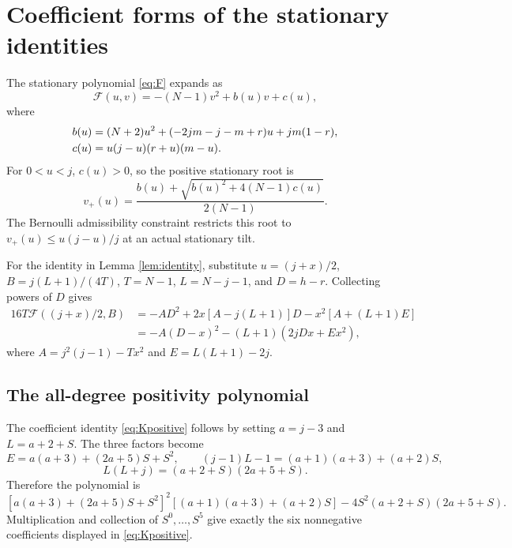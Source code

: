\section{Coefficient forms of the stationary identities}\label{app:algebra}
The stationary polynomial \eqref{eq:F} expands as
\begin{equation}\label{eq:explicitF}
 \mathcal F(u,v)=-(N-1)v^2+b(u)v+c(u),
\end{equation}
where
\begin{align}\label{eq:bc}
 b(u)&=(N+2)u^2+(-2jm-j-m+r)u+jm(1-r),\\
 c(u)&=u(j-u)(r+u)(m-u).\notag
\end{align}
For $0<u<j$, $c(u)>0$, so the positive stationary root is
\begin{equation}\label{eq:vplus}
 v_+(u)=\frac{b(u)+\sqrt{b(u)^2+4(N-1)c(u)}}{2(N-1)}.
\end{equation}
The Bernoulli admissibility constraint restricts this root to $v_+(u)\le u(j-u)/j$ at an actual stationary tilt.

For the identity in Lemma \ref{lem:identity}, substitute $u=(j+x)/2$, $B=j(L+1)/(4T)$, $T=N-1$, $L=N-j-1$, and $D=h-r$. Collecting powers of $D$ gives
\begin{align*}
 16T\mathcal F((j+x)/2,B)
 &=-AD^2+2x[A-j(L+1)]D-x^2[A+(L+1)E]\\
 &=-A(D-x)^2-(L+1)(2jDx+Ex^2),
\end{align*}
where $A=j^2(j-1)-Tx^2$ and $E=L(L+1)-2j$.

\subsection{The all-degree positivity polynomial}\label{app:poly}
The coefficient identity \eqref{eq:Kpositive} follows by setting $a=j-3$ and $L=a+2+S$. The three factors become
\[
 E=a(a+3)+(2a+5)S+S^2,\qquad
 (j-1)L-1=(a+1)(a+3)+(a+2)S,
\]
\[
 L(L+j)=(a+2+S)(2a+5+S).
\]
Therefore the polynomial is
\[
 [a(a+3)+(2a+5)S+S^2]^2[(a+1)(a+3)+(a+2)S]
 -4S^2(a+2+S)(2a+5+S).
\]
Multiplication and collection of $S^0,\ldots,S^5$ give exactly the six nonnegative coefficients displayed in \eqref{eq:Kpositive}.
